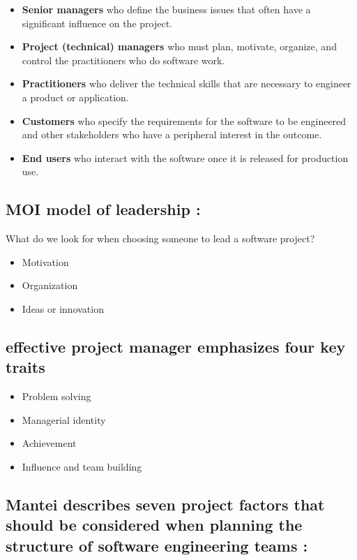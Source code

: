 \documentclass[12pt]{article}
\begin{document}
\begin{itemize}
	\item \textbf{Senior managers} who define the business issues that often have a significant
influence on the project.
	\item \textbf{Project (technical) managers} who must plan, motivate, organize, and control
the practitioners who do software work.
	\item \textbf{Practitioners} who deliver the technical skills that are necessary to engineer a
product or application.
	\item \textbf{Customers} who specify the requirements for the software to be engineered
and other stakeholders who have a peripheral interest in the outcome.
	\item \textbf{End users} who interact with the software once it is released for production use.
\end{itemize}



\subsection{MOI model of leadership : }

What do we
look for
when choosing
someone to lead a
software project?

\begin{itemize}
	\item Motivation
	\item Organization
	\item Ideas or innovation
\end{itemize}





\subsection{effective project manager emphasizes four key traits}

\begin{itemize}
	\item Problem solving
	\item Managerial identity
	\item Achievement
	\item Influence and team building
\end{itemize}




\subsection{Mantei describes seven project factors that should be considered when planning the structure of software engineering teams :}
\end{document}
